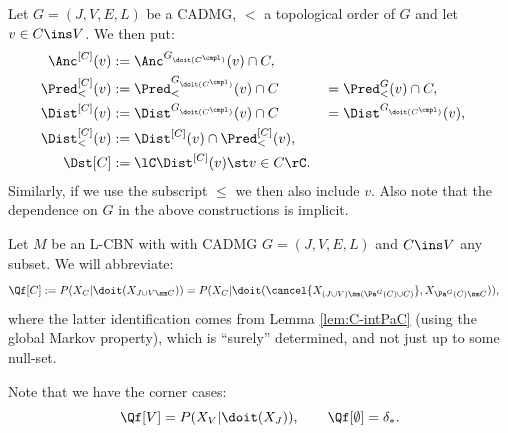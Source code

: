 \begin{Not}
    Let $G=(J,V,E,L)$  be a CADMG, $<$ a topological order of $G$ and let $v \in C \ins V$.
    We then put:
    \begin{align*}
        \Anc^{[C]}(v) &:= \Anc^{G_{\doit(C^\cmpl)}}(v) \cap C, \\
        \Pred^{[C]}_<(v)&:= \Pred_<^{G_{\doit(C^\cmpl)}}(v) \cap C &&= \Pred_<^{G}(v) \cap C, \\
        \Dist^{[C]}(v)&:= \Dist^{G_{\doit(C^\cmpl)}}(v) \cap C &&= \Dist^{G_{\doit(C^\cmpl)}}(v) , \\
        \Dist^{[C]}_<(v)&:= \Dist^{[C]}(v) \cap \Pred^{[C]}_<(v), \\
        \Dst[C] &:= \lC \Dist^{[C]}(v) \st v \in C \rC.
    \end{align*}
    Similarly, if we use the subscript $\le$ we then also include $v$.
    Also note that the dependence on $G$ in the above constructions is implicit.
\end{Not}



\begin{Not}
     Let $M$ be an L-CBN with with \observational CADMG $G=(J,V,E,L)$ and $C \ins V$ any subset.
     We will abbreviate:
    \begin{align*} \Qf[C] 
        &:= P(X_C|\doit(X_{J \cup V \sm C})) 
        = P(X_C|\doit(\cancel{X_{(J \cup V) \sm (\Pa^G(C) \cup C)}}, X_{\Pa^G(C)\sm C})),
    \end{align*}
    where the latter identification comes from Lemma \ref{lem:C-intPaC} (using the global Markov property), which is 
    ``surely'' determined, and not just up to some null-set.
    
    Note that we have the corner cases:
    \[ \Qf[V]=P(X_V|\doit(X_J)), \qquad \Qf[\emptyset]=\delta_\ast.  \]
\end{Not}



